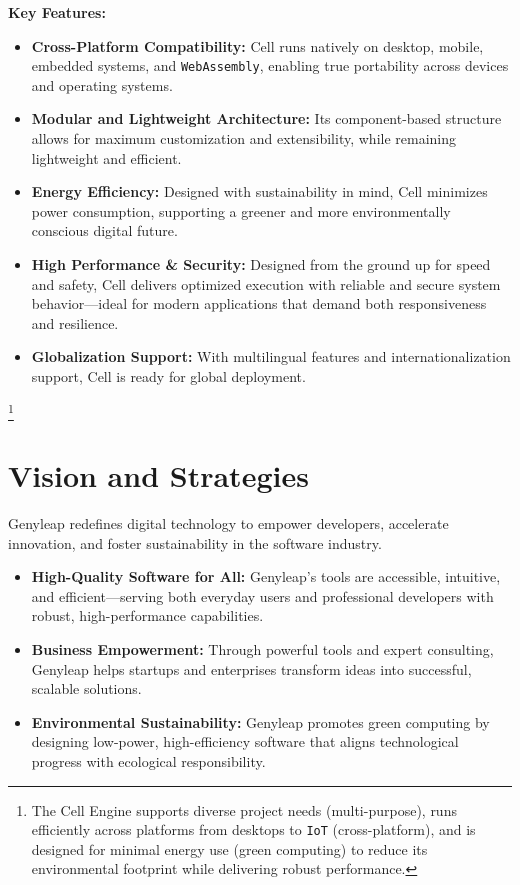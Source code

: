 \documentclass[a4paper,12pt,openany]{book}
\begin{document}
\textbf{Key Features:}
\begin{itemize}
    \item \textbf{Cross-Platform Compatibility:} Cell runs natively on desktop, mobile, embedded systems, and \texttt{WebAssembly}, enabling true portability across devices and operating systems.
    \item \textbf{Modular and Lightweight Architecture:} Its component-based structure allows for maximum customization and extensibility, while remaining lightweight and efficient.
    \item \textbf{Energy Efficiency:} Designed with sustainability in mind, Cell minimizes power consumption, supporting a greener and more environmentally conscious digital future.
    \item \textbf{High Performance \& Security:} Designed from the ground up for speed and safety, Cell delivers optimized execution with reliable and secure system behavior—ideal for modern applications that demand both responsiveness and resilience.
    \item \textbf{Globalization Support:} With multilingual features and internationalization support, Cell is ready for global deployment.
\end{itemize}

\footnote{The Cell Engine supports diverse project needs (multi-purpose), runs efficiently across platforms from desktops to \texttt{IoT} (cross-platform), and is designed for minimal energy use (green computing) to reduce its environmental footprint while delivering robust performance.}

\chapter{Vision and Strategies}

Genyleap redefines digital technology to empower developers, accelerate innovation, and foster sustainability in the software industry.

\begin{itemize}
    \item \textbf{High-Quality Software for All:} Genyleap’s tools are accessible, intuitive, and efficient—serving both everyday users and professional developers with robust, high-performance capabilities.
    \item \textbf{Business Empowerment:} Through powerful tools and expert consulting, Genyleap helps startups and enterprises transform ideas into successful, scalable solutions.
    \item \textbf{Environmental Sustainability:} Genyleap promotes green computing by designing low-power, high-efficiency software that aligns technological progress with ecological responsibility.
\end{itemize}
\end{document}
